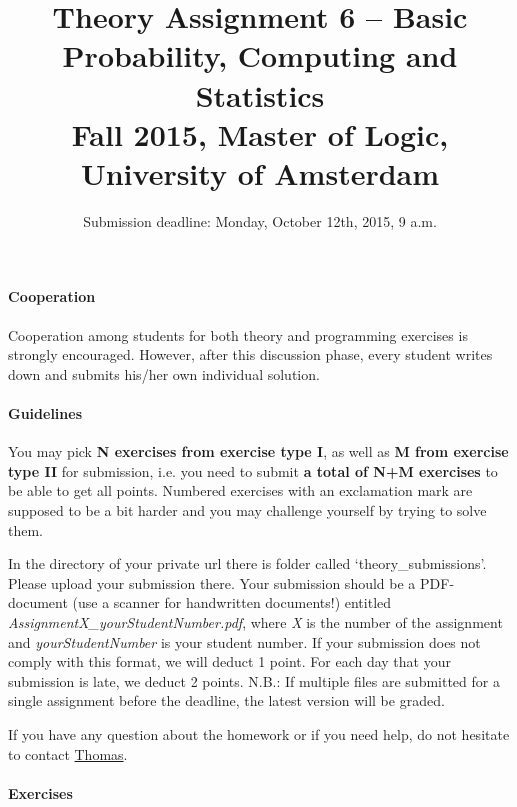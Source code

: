 \documentclass{article}
\title{Theory Assignment 6 -- Basic Probability, Computing and Statistics\\[2mm]
\large{Fall 2015, Master of Logic, University of Amsterdam}}
\author{}
\date{Submission deadline: Monday, October 12th, 2015, 9 a.m.}
\begin{document}
\maketitle

\paragraph{Cooperation}
Cooperation among students for both theory and programming exercises
is strongly encouraged.  However, after this discussion phase, every student writes down and submits his/her own individual solution.

\paragraph{Guidelines}
You may pick {\bf N exercises from exercise type I}, as well as {\bf M from exercise type II} for submission, i.e. you need to submit {\bf a total of N+M exercises} to be able to get all points. Numbered exercises with an exclamation mark are supposed to be a bit harder and you may challenge yourself by trying to solve them.

In the directory of your private url there is folder called `theory\_submissions'. Please upload your submission there. Your submission should be a PDF-document (use a scanner for handwritten documents!) entitled \textit{AssignmentX\_yourStudentNumber.pdf}, where \textit{X} is the number of the assignment and \textit{yourStudentNumber} is your student number. If your submission does not comply with this format, we will deduct 1 point. For each day that your submission is late, we deduct 2 points. N.B.: If multiple files are submitted for a single assignment before the deadline, the latest version will be graded.

If you have any question about the homework or if you need help, do not hesitate to contact \href{mailto:T.S.Brochhagen@uva.nl}{Thomas}.

\paragraph{Exercises}
\end{document}
